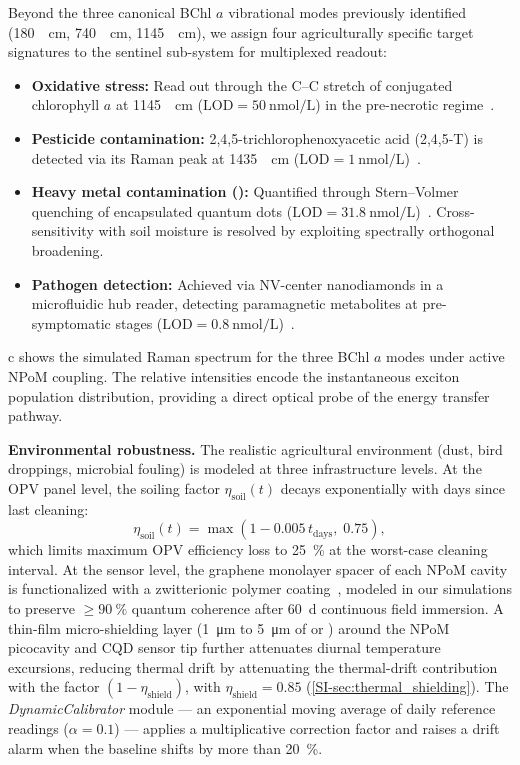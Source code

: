 \documentclass[12pt]{iopart}
\begin{document}
Beyond the three canonical BChl $a$ vibrational modes previously identified (\qty{180}{\per\cm}, \qty{740}{\per\cm}, \qty{1145}{\per\cm}), we assign four agriculturally specific target signatures to the sentinel sub-system for multiplexed readout:
\begin{itemize}
    \item \textbf{Oxidative stress:} Read out through the C--C stretch of conjugated chlorophyll $a$ at \qty{1145}{\per\cm} ($\mathrm{LOD} = \qty{50}{\nano\mol\per\L}$) in the pre-necrotic regime~\cite{CiallaMay2024}.
    \item \textbf{Pesticide contamination:} 2,4,5-trichlorophenoxyacetic acid (2,4,5-T) is detected via its Raman peak at \qty{1435}{\per\cm} ($\mathrm{LOD} = \qty{1}{\nano\mol\per\L}$)~\cite{CiallaMay2024}.
    \item \textbf{Heavy metal contamination ():} Quantified through Stern--Volmer quenching of encapsulated  quantum dots ($\mathrm{LOD} = \qty{31.8}{\nano\mol\per\L}$)~\cite{Mohammed2023}. Cross-sensitivity with soil moisture is resolved by exploiting spectrally orthogonal broadening.
    \item \textbf{Pathogen detection:} Achieved via NV-center nanodiamonds in a microfluidic hub reader, detecting paramagnetic metabolites at pre-symptomatic stages ($\mathrm{LOD} = \qty{0.8}{\nano\mol\per\L}$)~\cite{Ringstrom2026}.
\end{itemize}

c shows the simulated Raman spectrum for the three BChl $a$ modes under active NPoM coupling.
The relative intensities encode the instantaneous exciton population distribution, providing a direct optical probe of the energy transfer pathway.

\textbf{Environmental robustness.}
The realistic agricultural environment (dust, bird droppings, microbial fouling) is modeled at three infrastructure levels.
At the OPV panel level, the soiling factor $\eta_{\mathrm{soil}}(t)$ decays exponentially with days since last cleaning:
\begin{equation}
  \eta_{\mathrm{soil}}(t) = \max\!\left(1 - 0.005\,t_{\mathrm{days}},\; 0.75\right),
  \label{eq:soiling}
\end{equation}
which limits maximum OPV efficiency loss to \qty{25}{\percent} at the worst-case cleaning interval.
At the sensor level, the graphene monolayer spacer of each NPoM cavity is functionalized with a zwitterionic polymer coating~\cite{Kumar2022,Do2025}, modeled in our simulations to preserve $\geq\qty{90}{\percent}$ quantum coherence after \qty{60}{\day} continuous field immersion. A thin-film micro-shielding layer (\qty{1}{\micro\meter} to \qty{5}{\micro\meter} of  or ) around the NPoM picocavity and CQD sensor tip further attenuates diurnal temperature excursions, reducing thermal drift by attenuating the thermal-drift contribution with the factor $(1-\eta_{\mathrm{shield}})$, with $\eta_{\mathrm{shield}} = 0.85$ (\cref{SI-sec:thermal_shielding}). The \textit{DynamicCalibrator} module --- an exponential moving average of daily reference readings ($\alpha = 0.1$) --- applies a multiplicative correction factor and raises a drift alarm when the baseline shifts by more than \qty{20}{\percent}.
\end{document}
